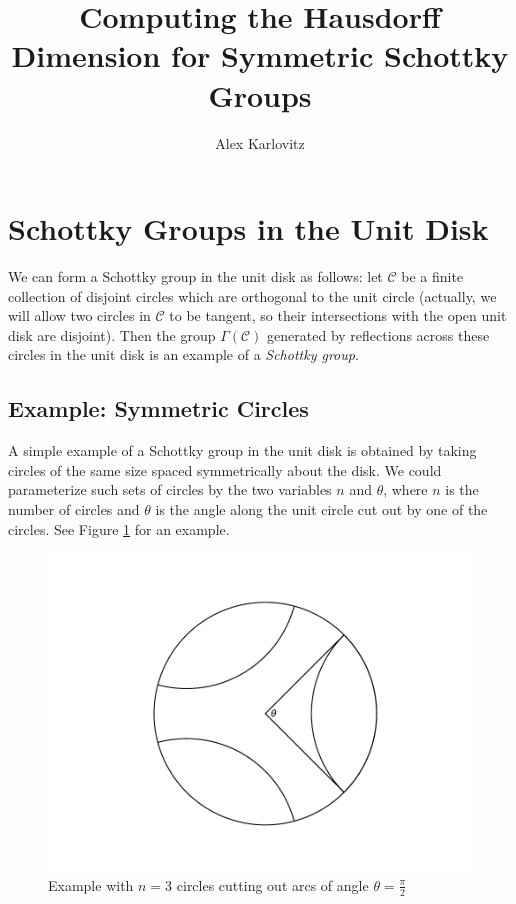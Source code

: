 \documentclass[]{article}
\title{Computing the Hausdorff Dimension for Symmetric Schottky Groups}
\author{Alex Karlovitz}
\date{}
\begin{document}
	
	\maketitle
	
\section*{Schottky Groups in the Unit Disk}

We can form a Schottky group in the unit disk as follows:
let $\mathcal{C}$ be a finite collection of disjoint circles which are orthogonal to the unit circle (actually, we will allow two circles in $\mathcal{C}$ to be tangent, so their intersections with the open unit disk are disjoint).
Then the group $\Gamma(\mathcal{C})$ generated by reflections across these circles in the unit disk is an example of a \textit{Schottky group}.

\subsection*{Example: Symmetric Circles}

A simple example of a Schottky group in the unit disk is obtained by taking circles of the same size spaced symmetrically about the disk.
We could parameterize such sets of circles by the two variables $n$ and $\theta$, where $n$ is the number of circles and $\theta$ is the angle along the unit circle cut out by one of the circles.
See Figure \ref{pi_over_2} for an example.

\begin{figure}[h]
	\centering
	\includegraphics[trim=110 40 100 50, clip, width=0.6\linewidth]{pi_over_2.pdf}
	\caption{Example with $n = 3$ circles cutting out arcs of angle $\theta = \frac{\pi}{2}$}
	\label{pi_over_2}
\end{figure}
\end{document}
